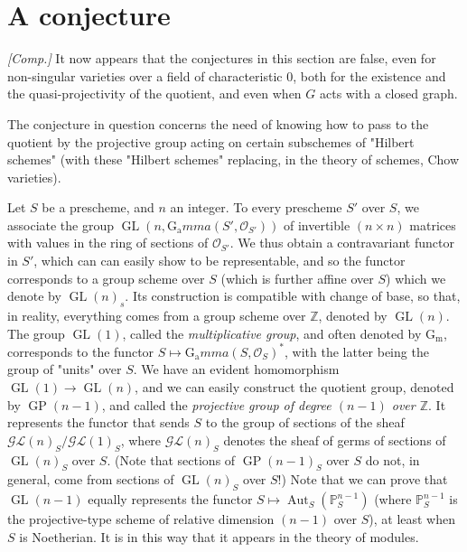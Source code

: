 \section{A conjecture}\label{fga3.iii-8}


\begin{remark}\label{fga3.iii-8-remark-i}
    \emph{[Comp.]}
    It now appears that the conjectures in this section are false, even for non-singular varieties over a field of characteristic $0$, both for the existence and the quasi-projectivity of the quotient, and even when $G$ acts with a closed graph.
\end{remark}


The conjecture in question concerns the need of knowing how to pass to the quotient by the projective group acting on certain subschemes of "Hilbert schemes" (with these "Hilbert schemes" replacing, in the theory of schemes, Chow varieties).


Let $S$ be a prescheme, and $n$ an integer.
To every prescheme $S'$ over $S$, we associate the group $\operatorname{GL}(n,\operatorname{G_a}mma(S',\mathcal{O}_{S'}))$ of invertible $(n\times n)$ matrices with values in the ring of sections of $\mathcal{O}_{S'}$.
We thus obtain a contravariant functor in $S'$, which can can easily show to be representable, and so the functor corresponds to a group scheme over $S$ (which is further affine over $S$) which we denote by $\operatorname{GL}(n)_s$.
Its construction is compatible with change of base, so that, in reality, everything comes from a group scheme over $\mathbb{Z}$, denoted by $\operatorname{GL}(n)$.
The group $\operatorname{GL}(1)$, called the \emph{multiplicative group}, and often denoted by $\operatorname{G_m}$, corresponds to the functor $S\mapsto\operatorname{G_a}mma(S,\mathcal{O}_S)^*$, with the latter being the group of "units" over $S$.
We have an evident homomorphism $\operatorname{GL}(1)\to\operatorname{GL}(n)$, and we can easily construct the quotient group, denoted by $\operatorname{GP}(n-1)$, and called the \emph{projective group of degree $(n-1)$ over $\mathbb{Z}$}.
It represents the functor that sends $S$ to the group of sections of the sheaf $\mathcal{GL}(n)_S/\mathcal{GL}(1)_S$, where $\mathcal{GL}(n)_S$ denotes the sheaf of germs of sections of $\operatorname{GL}(n)_S$ over $S$.
(Note that sections of $\operatorname{GP}(n-1)_S$ over $S$ do not, in general, come from sections of $\operatorname{GL}(n)_S$ over $S$!)
Note that we can prove that $\operatorname{GL}(n-1)$ equally represents the functor $S\mapsto\operatorname{Aut}_S(\mathbb{P}_S^{n-1})$ (where $\mathbb{P}_S^{n-1}$ is the projective-type scheme of relative dimension $(n-1)$ over $S$), at least when $S$ is Noetherian.
It is in this way that it appears in the theory of modules.



